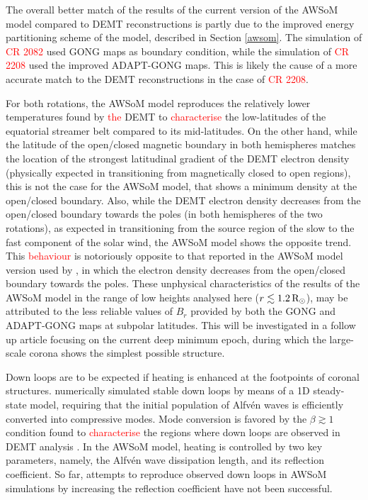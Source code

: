 \documentclass[namedreferences]{solarphysics}
\def\edit#1{\textcolor{Red}{#1}}
\newcommand{\mrsun}{{\rm R_\odot}}
\begin{document}
\begin{article}
{The overall better match of the results of the current version of the AWSoM model compared to DEMT reconstructions is partly due to the improved energy partitioning scheme of the model, described in Section \ref{awsom}. {The} simulation of \edit{CR 2082} used GONG maps as boundary condition, while the simulation of \edit{CR 2208} used the improved ADAPT-GONG maps. This is likely the cause {of a more accurate match} to the DEMT reconstructions in the case of \edit{CR 2208}.}

For both rotations, the AWSoM model reproduces the relatively lower temperatures found by \edit{the} DEMT to \edit{characterise} the low-latitudes of the equatorial streamer belt compared to its mid-latitudes. On the other hand, while the latitude of the open/closed magnetic boundary in both hemispheres matches the location of the strongest latitudinal gradient of the DEMT electron density {(physically expected in transitioning from magnetically closed to open regions)}, this is not the case for the AWSoM model, that shows a minimum density at the open/closed boundary. Also, while the DEMT electron density decreases from the open/closed boundary towards the poles (in both hemispheres of the two rotations), {as expected in transitioning from the source region of the slow to the fast component of the solar wind}, the AWSoM model shows the opposite trend. This \edit{behaviour} is notoriously opposite to that reported in the AWSoM model version used by \citet{oran_2015}, in which the electron density decreases from the open/closed boundary towards the poles. These unphysical characteristics of the results of the AWSoM model in the {range} of low heights analysed here ($r\lesssim 1.2\,\mrsun$), may be attributed to the less reliable values of $B_r$ provided by both the GONG and ADAPT-GONG maps at subpolar latitudes. This will {be investigated} in a follow up article focusing on the current deep minimum epoch, during which the large-scale corona shows the simplest possible structure.

Down loops are to be expected if heating is enhanced at the footpoints of coronal structures. \citet{schiff_2016} numerically simulated stable down loops by means of a 1D steady-state model, requiring that the initial population of Alfvén waves is efficiently converted into compressive modes. Mode conversion is favored by the $\beta\gtrsim 1 $ condition found to \edit{characterise} the regions where down loops are observed in DEMT analysis \citep{nuevo_2013}. In the AWSoM model, heating is controlled by two key parameters, namely, the Alfvén wave dissipation length, and its reflection coefficient. So far, attempts to reproduce observed down loops in AWSoM simulations by increasing the reflection coefficient have not been successful.


\end{article}
\end{document}
